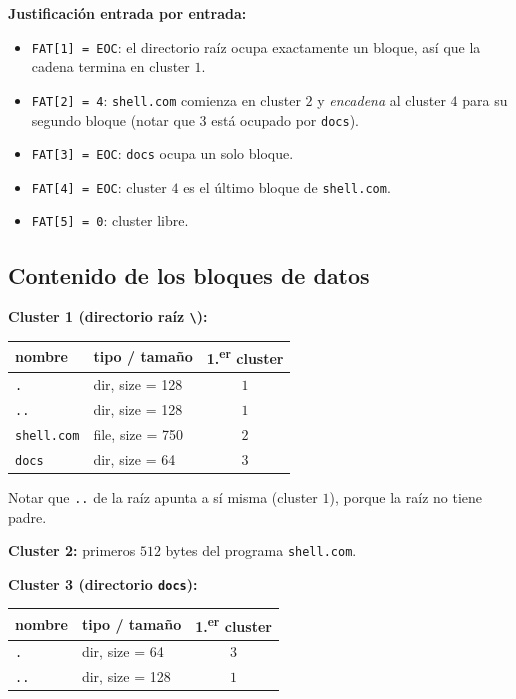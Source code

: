 \documentclass[11pt,a4paper]{article}
\begin{document}
\textbf{Justificación entrada por entrada:}

\begin{itemize}[leftmargin=*,nosep]
    \item \texttt{FAT[1] = EOC}: el directorio raíz ocupa exactamente
        un bloque, así que la cadena termina en cluster $1$.
    \item \texttt{FAT[2] = 4}: \texttt{shell.com} comienza en
        cluster $2$ y \emph{encadena} al cluster $4$ para su segundo
        bloque (notar que $3$ está ocupado por \texttt{docs}).
    \item \texttt{FAT[3] = EOC}: \texttt{docs} ocupa un solo bloque.
    \item \texttt{FAT[4] = EOC}: cluster $4$ es el último bloque de
        \texttt{shell.com}.
    \item \texttt{FAT[5] = 0}: cluster libre.
\end{itemize}

\subsection*{Contenido de los bloques de datos}

\textbf{Cluster 1 (directorio raíz \texttt{\textbackslash}):}

\begin{center}
\small
\begin{tabular}{@{}llc@{}}
\toprule
nombre & tipo / tamaño & 1.\textsuperscript{er} cluster \\
\midrule
\texttt{.}          & dir, size = 128 & $1$ \\
\texttt{..}         & dir, size = 128 & $1$ \\
\texttt{shell.com}  & file, size = 750 & $2$ \\
\texttt{docs}       & dir, size = 64  & $3$ \\
\bottomrule
\end{tabular}
\end{center}

Notar que \texttt{..} de la raíz apunta a sí misma (cluster $1$),
porque la raíz no tiene padre.

\textbf{Cluster 2:} primeros $512$ bytes del programa \texttt{shell.com}.

\textbf{Cluster 3 (directorio \texttt{docs}):}

\begin{center}
\small
\begin{tabular}{@{}llc@{}}
\toprule
nombre & tipo / tamaño & 1.\textsuperscript{er} cluster \\
\midrule
\texttt{.}  & dir, size = 64  & $3$ \\
\texttt{..} & dir, size = 128 & $1$ \\
\bottomrule
\end{tabular}
\end{center}
\end{document}
